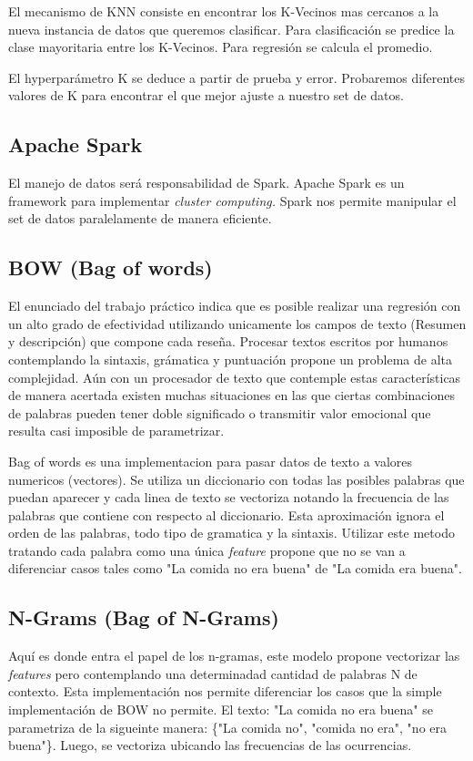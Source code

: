 \documentclass[a4paper,10pt]{article}
\begin{document}
	El mecanismo de KNN consiste en encontrar los K-Vecinos mas cercanos a la nueva instancia de datos que queremos clasificar. Para clasificación se predice la clase mayoritaria entre los K-Vecinos. Para regresión se calcula el promedio.
	
	El hyperparámetro K se deduce a partir de prueba y error. Probaremos diferentes valores de K para encontrar el que mejor ajuste a nuestro set de datos.
	
	\subsection{Apache Spark}
	El manejo de datos será responsabilidad de Spark. Apache Spark es un framework para implementar \textit{cluster computing.} Spark nos permite manipular el set de datos paralelamente de manera eficiente. 
	
	\subsection{BOW (Bag of words)}
	El enunciado del trabajo práctico indica que es posible realizar una regresión con un alto grado de efectividad utilizando unicamente los campos de texto (Resumen y descripción) que compone cada reseña. Procesar textos escritos por humanos contemplando la sintaxis, grámatica y puntuación propone un problema de alta complejidad. Aún con un procesador de texto que contemple estas características de manera acertada existen muchas situaciones en las que ciertas combinaciones de palabras pueden tener doble significado o transmitir valor emocional que resulta casi imposible de parametrizar.
	
	Bag of words es una implementacion para pasar datos de texto a valores numericos (vectores). Se utiliza un diccionario con todas las posibles palabras que puedan aparecer y cada linea de texto se vectoriza notando la frecuencia de las palabras que contiene con respecto al diccionario. Esta aproximación ignora el orden de las palabras, todo tipo de gramatica y la sintaxis. Utilizar este metodo tratando cada palabra como una única \textit{feature} propone que no se van a diferenciar casos tales como "La comida no era buena" de "La comida era buena".
	
	\subsection{N-Grams (Bag of N-Grams)}
	Aquí es donde entra el papel de los n-gramas, este modelo propone vectorizar las \textit{features} pero contemplando una determinadad cantidad de palabras N de contexto. Esta implementación nos permite diferenciar los casos que la simple implementación de BOW no permite.
	El texto: "La comida no era buena" se parametriza de la sigueinte manera: \{"La comida no", "comida no era", "no era buena"\}. Luego, se vectoriza ubicando las frecuencias de las ocurrencias.
	
\end{document}

